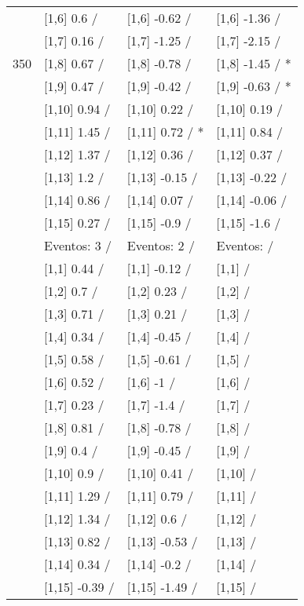 \begin{table}
\begin{tabular}[t]{llll}
 & {}[1,6] 0.6  / & {}[1,6] -0.62  / & {}[1,6] -1.36  /\\
 & {}[1,7] 0.16  / & {}[1,7] -1.25  / & {}[1,7] -2.15  /\\
350 & {}[1,8] 0.67  / & {}[1,8] -0.78  / & {}[1,8] -1.45  / *\\
\addlinespace
 & {}[1,9] 0.47  / & {}[1,9] -0.42  / & {}[1,9] -0.63  / *\\
 & {}[1,10] 0.94  / & {}[1,10] 0.22  / & {}[1,10] 0.19  /\\
 & {}[1,11] 1.45  / & {}[1,11] 0.72  / * & {}[1,11] 0.84  /\\
 & {}[1,12] 1.37  / & {}[1,12] 0.36  / & {}[1,12] 0.37  /\\
 & {}[1,13] 1.2  / & {}[1,13] -0.15  / & {}[1,13] -0.22  /\\
\addlinespace
 & {}[1,14] 0.86  / & {}[1,14] 0.07  / & {}[1,14] -0.06  /\\
 & {}[1,15] 0.27  / & {}[1,15] -0.9  / & {}[1,15] -1.6  /\\
 & Eventos:  3 / & Eventos:  2 / & Eventos:   /\\
 & {}[1,1] 0.44  / & {}[1,1] -0.12  / & {}[1,1]  /\\
 & {}[1,2] 0.7  / & {}[1,2] 0.23  / & {}[1,2]  /\\
\addlinespace
 & {}[1,3] 0.71  / & {}[1,3] 0.21  / & {}[1,3]  /\\
 & {}[1,4] 0.34  / & {}[1,4] -0.45  / & {}[1,4]  /\\
 & {}[1,5] 0.58  / & {}[1,5] -0.61  / & {}[1,5]  /\\
 & {}[1,6] 0.52  / & {}[1,6] -1  / & {}[1,6]  /\\
 & {}[1,7] 0.23  / & {}[1,7] -1.4  / & {}[1,7]  /\\
\addlinespace
500 & {}[1,8] 0.81  / & {}[1,8] -0.78  / & {}[1,8]  /\\
 & {}[1,9] 0.4  / & {}[1,9] -0.45  / & {}[1,9]  /\\
 & {}[1,10] 0.9  / & {}[1,10] 0.41  / & {}[1,10]  /\\
 & {}[1,11] 1.29  / & {}[1,11] 0.79  / & {}[1,11]  /\\
 & {}[1,12] 1.34  / & {}[1,12] 0.6  / & {}[1,12]  /\\
\addlinespace
 & {}[1,13] 0.82  / & {}[1,13] -0.53  / & {}[1,13]  /\\
 & {}[1,14] 0.34  / & {}[1,14] -0.2  / & {}[1,14]  /\\
 & {}[1,15] -0.39  / & {}[1,15] -1.49  / & {}[1,15]  /\\
\bottomrule
\end{tabular}
\end{table}
